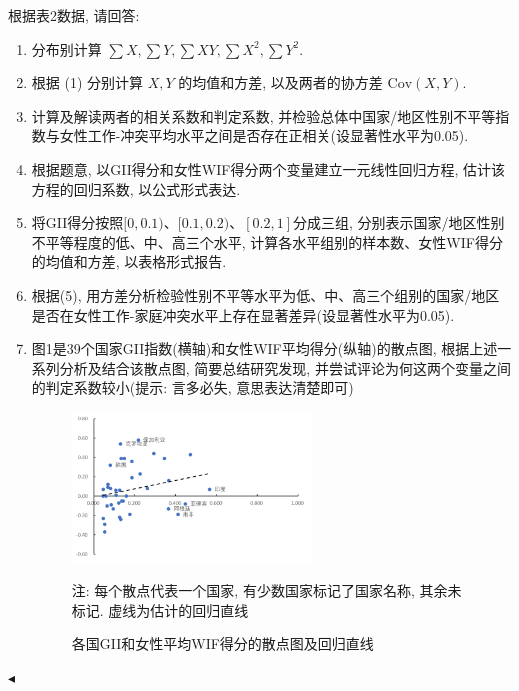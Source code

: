 \documentclass[11pt]{article}
\newenvironment{problem}[2][Problem]{\begin{trivlist}
\item[\hskip \labelsep {\bfseries #1}\hskip \labelsep {\bfseries #2.}]\songti}{\hfill$\blacktriangleleft$\end{trivlist}}
\newcommand\1{\mathds{1}}
\newcommand\Cov{\mathrm{Cov}}
\begin{document}
\begin{problem}{2}
    根据表2数据, 请回答:
    \begin{enumerate}[label=(\arabic*)]
        \item 分布别计算 $\sum X, \sum Y, \sum XY, \sum X^2, \sum Y^2$.
        \item 根据 (1) 分别计算 $X,Y$ 的均值和方差, 以及两者的协方差 $\Cov(X,Y)$.
        \item 计算及解读两者的相关系数和判定系数, 并检验总体中国家/地区性别不平等指数与女性工作-冲突平均水平之间是否存在正相关(设显著性水平为0.05). 
        \item 根据题意, 以GII得分和女性WIF得分两个变量建立一元线性回归方程, 估计该方程的回归系数, 以公式形式表达. 
        \item 将GII得分按照$[0,0.1)、[0.1,0.2)、[0.2,1]$分成三组, 分别表示国家/地区性别不平等程度的低、中、高三个水平, 计算各水平组别的样本数、女性WIF得分的均值和方差, 以表格形式报告. 
        \item 根据(5), 用方差分析检验性别不平等水平为低、中、高三个组别的国家/地区是否在女性工作-家庭冲突水平上存在显著差异(设显著性水平为0.05). 
        \item 图1是39个国家GII指数(横轴)和女性WIF平均得分(纵轴)的散点图, 根据上述一系列分析及结合该散点图, 简要总结研究发现, 并尝试评论为何这两个变量之间的判定系数较小{\kaishu(提示: 言多必失, 意思表达清楚即可)}
        \begin{figure}[H]
            \centering
            \includegraphics[width=0.6\textwidth]{Picture1.png}
            \caption*{\footnotesize 注: 每个散点代表一个国家, 有少数国家标记了国家名称, 其余未标记. 虚线为估计的回归直线}
            \caption{各国GII和女性平均WIF得分的散点图及回归直线}
            \label{fig:1.1}
        \end{figure}
    \end{enumerate}
\end{problem}
\end{document}
